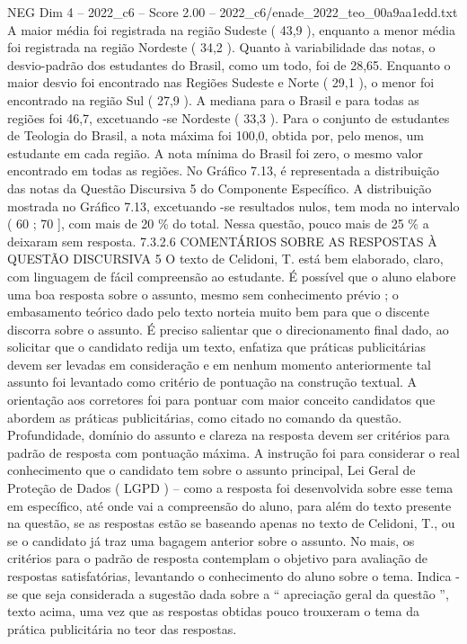\begin{textsample}{NEG Dim 4 – 2022\_c6 – Score 2.00 – 2022\_c6/enade\_2022\_teo\_00a9aa1edd.txt}
A maior média foi registrada na região Sudeste ( 43,9 ), enquanto a menor média foi registrada na região Nordeste ( 34,2 ).
Quanto à variabilidade das notas, o desvio-padrão dos estudantes do Brasil, como um todo, foi de 28,65.
Enquanto o maior desvio foi encontrado nas Regiões Sudeste e Norte ( 29,1 ), o menor foi encontrado na região Sul ( 27,9 ).
A mediana para o Brasil e para todas as regiões foi 46,7, excetuando -se Nordeste ( 33,3 ).
Para o conjunto de estudantes de Teologia do Brasil, a nota máxima foi 100,0, obtida por, pelo menos, um estudante em cada região.
A nota mínima do Brasil foi zero, o mesmo valor encontrado em todas as regiões.
No Gráfico 7.13, é representada a distribuição das notas da Questão Discursiva 5 do Componente Específico.
A distribuição mostrada no Gráfico 7.13, excetuando -se resultados nulos, tem moda no intervalo ( 60 ; 70 ], com mais de 20 \% do total.
Nessa questão, pouco mais de 25 \% a deixaram sem resposta. 7.3.2.6 COMENTÁRIOS SOBRE AS RESPOSTAS À QUESTÃO DISCURSIVA 5 O texto de Celidoni, T. está bem elaborado, claro, com linguagem de fácil compreensão ao estudante.
É possível que o aluno elabore uma boa resposta sobre o assunto, mesmo sem conhecimento prévio ; o embasamento teórico dado pelo texto norteia muito bem para que o discente discorra sobre o assunto.
É preciso salientar que o direcionamento final dado, ao solicitar que o candidato redija um texto, enfatiza que práticas publicitárias devem ser levadas em consideração e em nenhum momento anteriormente tal assunto foi levantado como critério de pontuação na construção textual.
A orientação aos corretores foi para pontuar com maior conceito candidatos que abordem as práticas publicitárias, como citado no comando da questão.
Profundidade, domínio do assunto e clareza na resposta devem ser critérios para padrão de resposta com pontuação máxima.
A instrução foi para considerar o real conhecimento que o candidato tem sobre o assunto principal, Lei Geral de Proteção de Dados ( LGPD ) – como a resposta foi desenvolvida sobre esse tema em específico, até onde vai a compreensão do aluno, para além do texto presente na questão, se as respostas estão se baseando apenas no texto de Celidoni, T., ou se o candidato já traz uma bagagem anterior sobre o assunto.
No mais, os critérios para o padrão de resposta contemplam o objetivo para avaliação de respostas satisfatórias, levantando o conhecimento do aluno sobre o tema.
Indica -se que seja considerada a sugestão dada sobre a “ apreciação geral da questão ”, texto acima, uma vez que as respostas obtidas pouco trouxeram o tema da prática publicitária no teor das respostas.

\end{textsample}
